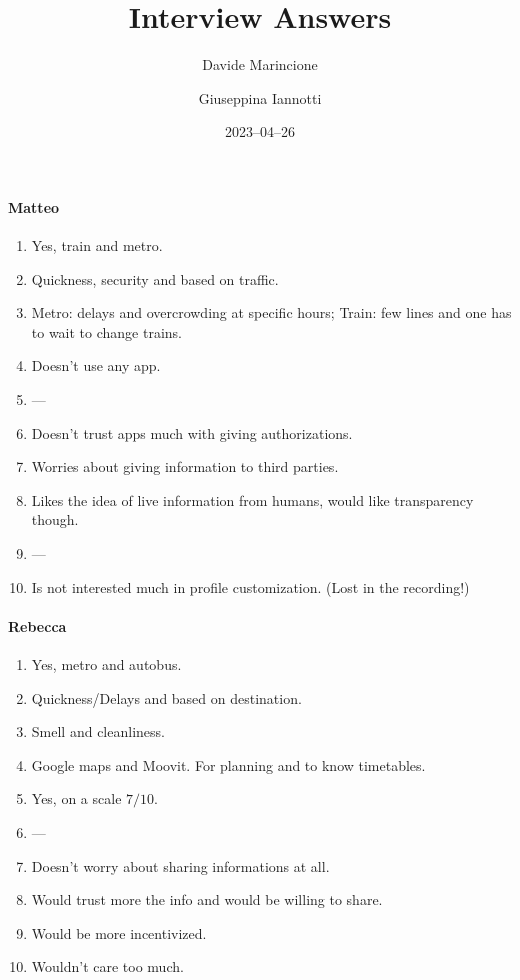 \documentclass[a4paper, 11pt, twocolumn]{article}
\title{Interview Answers}
\author{Davide Marincione \and Giuseppina Iannotti}
\date{2023--04--26}
\begin{document}
\maketitle
\paragraph*{Matteo}
\begin{enumerate}
	\item Yes, train and metro.
	\item Quickness, security and based on traffic.
	\item Metro: delays and overcrowding at specific hours; Train: few lines and one has to wait to change trains.
	\item Doesn't use any app.
	\item ---
	\item Doesn't trust apps much with giving authorizations.
	\item Worries about giving information to third parties.
	\item Likes the idea of live information from humans, would like transparency though.
	\item ---
	\item Is not interested much in profile customization. (Lost in the recording!)
\end{enumerate}

\paragraph*{Rebecca}
\begin{enumerate}
	\item Yes, metro and autobus.
	\item Quickness/Delays and based on destination.
	\item Smell and cleanliness.
	\item Google maps and Moovit. For planning and to know timetables.
	\item Yes, on a scale $7/10$.
	\item ---
	\item Doesn't worry about sharing informations at all.
	\item Would trust more the info and would be willing to share.
	\item Would be more incentivized.
	\item Wouldn't care too much.
\end{enumerate}
\end{document}
